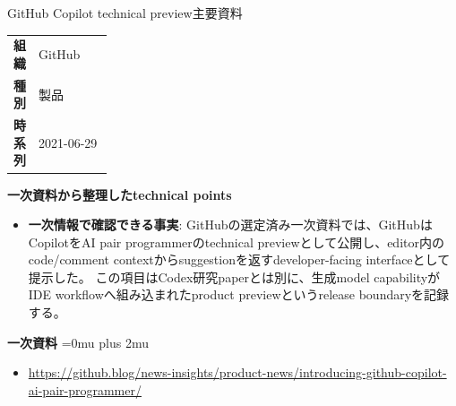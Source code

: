 \begin{technicalnote}{GitHub Copilot technical preview}{主要資料}
\begingroup
\begin{tabularx}{\linewidth}{@{}>{\bfseries}p{0.22\linewidth}X@{}}
組織 & GitHub \\
種別 & 製品 \\
時系列 & 2021-06-29 \\
\end{tabularx}
\smallskip
\begin{minipage}{\linewidth}
{\bfseries 一次資料から整理したtechnical points}
\begin{itemize}[leftmargin=1.5em,itemsep=0.35em]
\item \textbf{一次情報で確認できる事実}: GitHubの選定済み一次資料では、GitHubはCopilotをAI pair programmerのtechnical previewとして公開し、editor内のcode/comment contextからsuggestionを返すdeveloper-facing interfaceとして提示した。 この項目はCodex研究paperとは別に、生成model capabilityがIDE workflowへ組み込まれたproduct previewというrelease boundaryを記録する。
\end{itemize}
\begin{minipage}{\linewidth}
\begin{samepage}
{\bfseries 一次資料}
\begingroup\sloppy
\Urlmuskip=0mu plus 2mu\relax
\begin{itemize}[leftmargin=1.5em,itemsep=0.25em]
\item {\scriptsize\url{https://github.blog/news-insights/product-news/introducing-github-copilot-ai-pair-programmer/}}
\end{itemize}
\endgroup
\end{samepage}
\end{minipage}
\end{minipage}
\endgroup
\end{technicalnote}
\medskip
